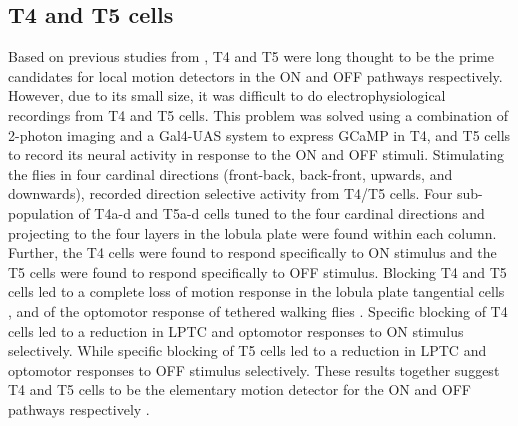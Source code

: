 \subsection{T4 and T5 cells}
Based on previous studies from \parencite{Fischbach1989, Buchner1984}, T4 and T5 were long thought to be the prime candidates for local motion detectors in the ON and OFF pathways respectively. However, due to its small size, it was difficult to do electrophysiological recordings from T4 and T5 cells. This problem was solved using a combination of 2-photon imaging and a Gal4-UAS system to express GCaMP in T4, and T5 cells to record its neural activity in response to the ON and OFF stimuli. Stimulating the flies in four cardinal directions (front-back, back-front, upwards, and downwards), \cite{Maisak2013} recorded direction selective activity from T4/T5 cells. Four sub-population of T4a-d and T5a-d cells tuned to the four cardinal directions and projecting to the four layers in the lobula plate were found within each column. Further, the T4 cells were found to respond specifically to ON stimulus and the T5 cells were found to respond specifically to OFF stimulus. Blocking T4 and T5 cells led to a complete loss of motion response in the lobula plate tangential cells \parencite{Schnell2012}, and of the optomotor response of tethered walking flies \parencite{Bahl2013}. Specific blocking of T4 cells led to a reduction in LPTC and optomotor responses to ON stimulus selectively. While specific blocking of T5 cells led to a reduction in LPTC and optomotor responses to OFF stimulus selectively. These results together suggest T4 and T5 cells to be the elementary motion detector for the ON and OFF pathways respectively \parencite{Maisak2013}.      

